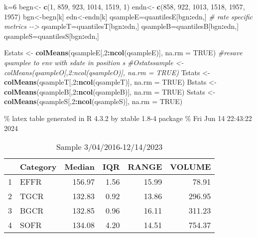 \documentclass[
]{article}
\newenvironment{Shaded}{\begin{snugshade}}{\end{snugshade}}
\newcommand{\AttributeTok}[1]{\textcolor[rgb]{0.13,0.29,0.53}{#1}}
\newcommand{\CommentTok}[1]{\textcolor[rgb]{0.56,0.35,0.01}{\textit{#1}}}
\newcommand{\ConstantTok}[1]{\textcolor[rgb]{0.56,0.35,0.01}{#1}}
\newcommand{\DecValTok}[1]{\textcolor[rgb]{0.00,0.00,0.81}{#1}}
\newcommand{\FunctionTok}[1]{\textcolor[rgb]{0.13,0.29,0.53}{\textbf{#1}}}
\newcommand{\NormalTok}[1]{#1}
\newcommand{\OtherTok}[1]{\textcolor[rgb]{0.56,0.35,0.01}{#1}}
\newcommand{\SpecialCharTok}[1]{\textcolor[rgb]{0.81,0.36,0.00}{\textbf{#1}}}
\begin{document}
\begin{Shaded}
\begin{Highlighting}[]
\NormalTok{k}\OtherTok{=}\DecValTok{6}
\NormalTok{begn}\OtherTok{\textless{}{-}} \FunctionTok{c}\NormalTok{(}\DecValTok{1}\NormalTok{, }\DecValTok{859}\NormalTok{, }\DecValTok{923}\NormalTok{,  }\DecValTok{1014}\NormalTok{, }\DecValTok{1519}\NormalTok{, }\DecValTok{1}\NormalTok{)}
\NormalTok{endn}\OtherTok{\textless{}{-}} \FunctionTok{c}\NormalTok{(}\DecValTok{858}\NormalTok{, }\DecValTok{922}\NormalTok{, }\DecValTok{1013}\NormalTok{, }\DecValTok{1518}\NormalTok{, }\DecValTok{1957}\NormalTok{, }\DecValTok{1957}\NormalTok{)}
\NormalTok{bgn}\OtherTok{\textless{}{-}}\NormalTok{begn[k]}
\NormalTok{edn}\OtherTok{\textless{}{-}}\NormalTok{endn[k]}
\NormalTok{qsampleE}\OtherTok{=}\NormalTok{quantilesE[bgn}\SpecialCharTok{:}\NormalTok{edn,] }\CommentTok{\# rate specific metrics  {-}{-}\textgreater{}}
\NormalTok{qsampleT}\OtherTok{=}\NormalTok{quantilesT[bgn}\SpecialCharTok{:}\NormalTok{edn,] }
\NormalTok{qsampleB}\OtherTok{=}\NormalTok{quantilesB[bgn}\SpecialCharTok{:}\NormalTok{edn,] }
\NormalTok{qsampleS}\OtherTok{=}\NormalTok{quantilesS[bgn}\SpecialCharTok{:}\NormalTok{edn,] }

\NormalTok{Estats }\OtherTok{\textless{}{-}} \FunctionTok{colMeans}\NormalTok{(qsampleE[,}\DecValTok{2}\SpecialCharTok{:}\FunctionTok{ncol}\NormalTok{(qsampleE)], }\AttributeTok{na.rm =} \ConstantTok{TRUE}\NormalTok{)}
\CommentTok{\#resave qsamplee to env with sdate in position s}
\CommentTok{\#Ostatssample \textless{}{-} colMeans(qsampleO[,2:ncol(qsampleO)], na.rm = TRUE)}
\NormalTok{Tstats }\OtherTok{\textless{}{-}} \FunctionTok{colMeans}\NormalTok{(qsampleT[,}\DecValTok{2}\SpecialCharTok{:}\FunctionTok{ncol}\NormalTok{(qsampleT)], }\AttributeTok{na.rm =} \ConstantTok{TRUE}\NormalTok{)}
\NormalTok{Bstats }\OtherTok{\textless{}{-}} \FunctionTok{colMeans}\NormalTok{(qsampleB[,}\DecValTok{2}\SpecialCharTok{:}\FunctionTok{ncol}\NormalTok{(qsampleB)], }\AttributeTok{na.rm =} \ConstantTok{TRUE}\NormalTok{)}
\NormalTok{Sstats }\OtherTok{\textless{}{-}} \FunctionTok{colMeans}\NormalTok{(qsampleS[,}\DecValTok{2}\SpecialCharTok{:}\FunctionTok{ncol}\NormalTok{(qsampleS)], }\AttributeTok{na.rm =} \ConstantTok{TRUE}\NormalTok{)}
\end{Highlighting}
\end{Shaded}

\% latex table generated in R 4.3.2 by xtable 1.8-4 package
\% Fri Jun 14 22:43:22 2024

\begin{table}[ht]
\centering
\begin{tabular}{rlrrrr}
  \hline
 & Category & Median & IQR & RANGE & VOLUME \\ 
  \hline
1 & EFFR & 156.97 & 1.56 & 15.99 & 78.91 \\ 
  2 & TGCR & 132.83 & 0.92 & 13.86 & 296.95 \\ 
  3 & BGCR & 132.85 & 0.96 & 16.11 & 311.23 \\ 
  4 & SOFR & 134.08 & 4.20 & 14.51 & 754.37 \\ 
   \hline
\end{tabular}
\caption{Sample 3/04/2016-12/14/2023} 
\end{table}
\end{document}
